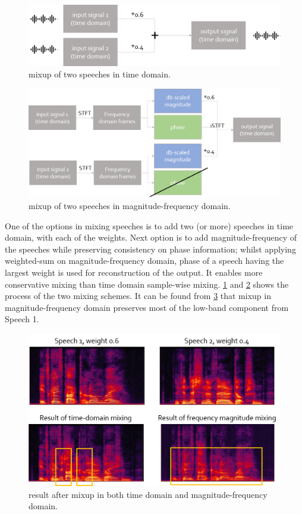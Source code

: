 \documentclass[10pt,twocolumn,letterpaper]{article}
\begin{document}
\begin{figure}[h]
   \centering
   \includegraphics[width=\linewidth]{time_add}
   \caption{mixup of two speeches in time domain.}
   \label{fig:time_add}
\end{figure} 

\begin{figure}[h]
   \centering
   \includegraphics[width=\linewidth]{freq_add}
   \caption{mixup of two speeches in magnitude-frequency domain.}
   \label{fig:freq_add}
\end{figure} 

One of the options in mixing speeches is to add two (or more) speeches in time domain, with each of the weights.
Next option is to add magnitude-frequency of the speeches while preserving consistency on phase information;
whilst applying weighted-sum on magnitude-frequency domain, phase of a speech having the largest weight is used 
for reconstruction of the output. It enables more conservative mixing than time domain sample-wise mixing.
\cref{fig:time_add} and \cref{fig:freq_add} shows the process of the two mixing schemes.
It can be found from \cref{fig:add_result} that mixup in magnitude-frequency domain preserves most of the 
low-band component from Speech 1.

\begin{figure}[h]
   \centering
   \includegraphics[width=\linewidth]{add_result}
   \caption{result after mixup in both time domain and magnitude-frequency domain.}
   \label{fig:add_result}
\end{figure}
\end{document}
